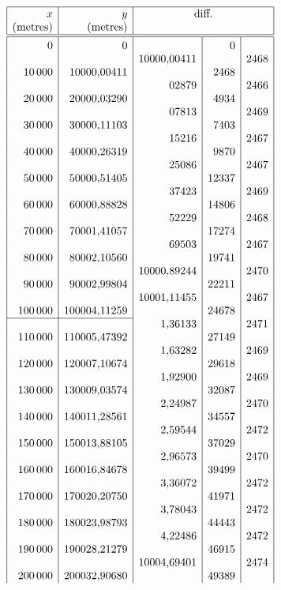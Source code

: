 {\small\renewcommand{\arraystretch}{.60}
\[\begin{array}{|r|r|r|r|r|}\hline
\rule{0pt}{2.1ex}x&y&\multicolumn{3}{c|}{\text{diff.}}\\
\rule[-3.6pt]{0pt}{3.6pt}\text{(metres)}&\text{(metres)}&\multicolumn{3}{c|}{}\\\hline\hline
\rule{0pt}{2.5ex}0&0&&0&\\
&&10000{,}00411&&2468\\
10\,000&10000{,}00411&&2468&\\
&&02879&&2466\\
20\,000&20000{,}03290&&4934&\\
&&07813&&2469\\
30\,000&30000{,}11103&&7403&\\
&&15216&&2467\\
40\,000&40000{,}26319&&9870&\\
&&25086&&2467\\
50\,000&50000{,}51405&&12337&\\
&&37423&&2469\\
60\,000&60000{,}88828&&14806&\\
&&52229&&2468\\
70\,000&70001{,}41057&&17274&\\
&&69503&&2467\\
80\,000&80002{,}10560&&19741&\\
&&10000{,}89244&&2470\\
90\,000&90002{,}99804&&22211&\\
&&10001{,}11455&&2467\\
100\,000&100004{,}11259&&24678&\\
\cline{1-2}
&&1{,}36133&&2471\\
110\,000&110005{,}47392&&27149&\\
&&1{,}63282&&2469\\
120\,000&120007{,}10674&&29618&\\
&&1{,}92900&&2469\\
130\,000&130009{,}03574&&32087&\\
&&2{,}24987&&2470\\
140\,000&140011{,}28561&&34557&\\
&&2{,}59544&&2472\\
150\,000&150013{,}88105&&37029&\\
&&2{,}96573&&2470\\
160\,000&160016{,}84678&&39499&\\
&&3{,}36072&&2472\\
170\,000&170020{,}20750&&41971&\\
&&3{,}78043&&2472\\
180\,000&180023{,}98793&&44443&\\
&&4{,}22486&&2472\\
190\,000&190028{,}21279&&46915&\\
&&10004{,}69401&&2474\\
200\,000&200032{,}90680&&49389&\\
\end{array}\]
}


